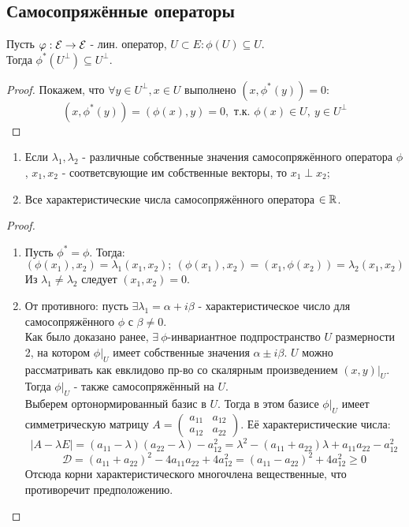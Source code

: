 \subsection{Самосопряжённые операторы}
\begin{lemma}
    Пусть $\varphi: \mathcal{E} \rightarrow \mathcal{E}$ - лин. оператор, $U \subset E: \phi(U) \subseteq U$.\\
    Тогда $\phi^*(U^\perp) \subseteq U^\perp$.
\end{lemma}
\begin{proof}
    Покажем, что $\forall y \in U^\perp, x \in U$ выполнено $(x, \phi^*(y)) = 0$:
    $$(x, \phi^*(y)) = (\phi(x), y) = 0, \text{ т.к. } \phi(x) \in U, \ y \in U^\perp$$
\end{proof}
\begin{subtheorem}
    \begin{enumerate}
        \item Если $\lambda_1, \lambda_2$ - различные собственные значения самосопряжённого оператора $\phi$, $x_1, x_2$ - соответсвующие им собственные векторы, то $x_1 \perp x_2$;
        \item Все характеристические числа самосопряжённого оператора $\in \mathbb{R}$.
    \end{enumerate}
\end{subtheorem}
\begin{proof} \tab
    \begin{enumerate}
        \item Пусть $\phi^* = \phi$. Тогда:
        $$(\phi(x_1), x_2) = \lambda_1(x_1, x_2); \ (\phi(x_1), x_2) = (x_1, \phi(x_2)) = \lambda_2(x_1, x_2)$$
        Из $\lambda_1 \neq \lambda_2$ следует $(x_1, x_2) = 0$. 
        \item От противного: пусть $\exists \lambda_1 = \alpha + i\beta$ - характеристическое число для самосопряжённого $\phi$ с $\beta \neq 0$.\\
        Как было доказано ранее, $\exists \ \phi$-инвариантное подпространство $U$ размерности 2, на котором $\phi|_U$ имеет собственные значения $\alpha \pm i\beta$.
        $U$ можно рассматривать как евклидово пр-во со скалярным произведением $(x, y)|_U$. Тогда $\phi|_U$ - также самосопряжённый на $U$.\\
        Выберем ортонормированный базис в $U$. Тогда в этом базисе $\phi|_U$ имеет симметрическую матрицу $A = \begin{pmatrix} a_{11}&a_{12} \\ a_{12}&a_{22} \end{pmatrix}$. Её характеристические числа:
        $$|A - \lambda E| = (a_{11} - \lambda)(a_{22} - \lambda) - a_{12}^2 = \lambda^2 - (a_{11} + a_{22})\lambda + a_{11}a_{22} - a_{12}^2$$
        $$\mathcal{D} = (a_{11} + a_{22})^2 - 4a_{11}a_{22} + 4a_{12}^2 = (a_{11} - a_{22})^2 + 4a_{12}^2 \geqslant 0$$
        Отсюда корни характеристического многочлена вещественные, что противоречит предположению.
    \end{enumerate}
\end{proof}
